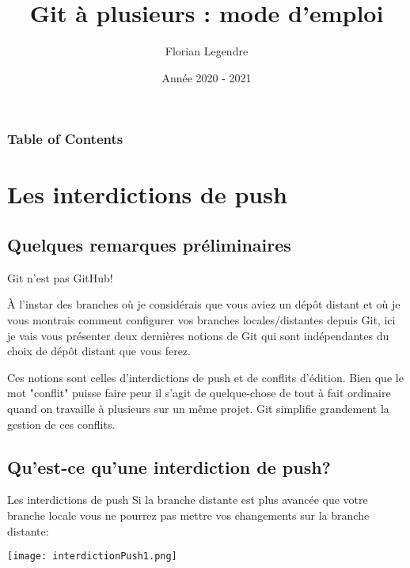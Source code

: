 \documentclass{beamer}
\title[Git collaboratif]{Git à plusieurs : mode d'emploi}
\author{Florian Legendre}
\institute{Université de Poitiers}
\date{Année 2020 - 2021}
\begin{document}
\frame{\titlepage}

\begin{frame}
\frametitle{Table of Contents}
\tableofcontents[hideallsubsections]
\end{frame}



\section{Les interdictions de push}

\subsection{Quelques remarques préliminaires}
\begin{frame}{Git n'est pas GitHub!}

À l'instar des branches où je considérais que vous aviez un dépôt distant et où je vous  montrais comment configurer vos branches locales/distantes depuis Git, ici je vais vous présenter deux dernières notions de Git qui sont indépendantes du choix de dépôt distant que vous ferez.\\
\medskip

Ces notions sont celles d'interdictions de push et de conflits d'édition. Bien que le mot "conflit" puisse faire peur il s'agit de quelque-chose de tout à fait ordinaire quand on travaille à plusieurs sur un même projet. Git simplifie grandement la gestion de ces conflits.\\
\end{frame}


\subsection{Qu'est-ce qu'une interdiction de push?}
\begin{frame}{Les interdictions de push}
Si la branche distante est plus avancée que votre branche locale vous ne pourrez pas mettre vos changements sur la branche distante:

\begin{center}
	\texttt{[image: interdictionPush1.png]}
\end{center}

\end{frame}
\end{document}
